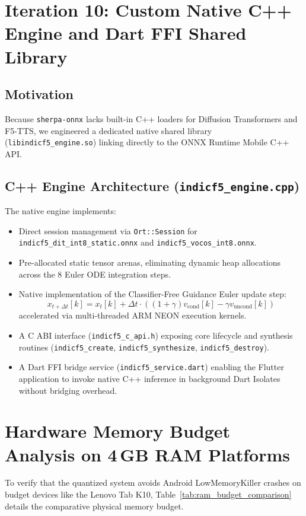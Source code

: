 \section{Iteration 10: Custom Native C++ Engine and Dart FFI Shared Library}
\subsection{Motivation}
Because \texttt{sherpa-onnx} lacks built-in C++ loaders for Diffusion Transformers and F5-TTS, we engineered a dedicated native shared library (\texttt{libindicf5\_engine.so}) linking directly to the ONNX Runtime Mobile C++ API.

\subsection{C++ Engine Architecture (\texttt{indicf5\_engine.cpp})}
The native engine implements:
\begin{itemize}
    \item Direct session management via \texttt{Ort::Session} for \texttt{indicf5\_dit\_int8\_static.onnx} and \texttt{indicf5\_vocos\_int8.onnx}.
    \item Pre-allocated static tensor arenas, eliminating dynamic heap allocations across the 8 Euler ODE integration steps.
    \item Native implementation of the Classifier-Free Guidance Euler update step:
    \begin{equation}
        x_{t+\Delta t}[k] = x_t[k] + \Delta t \cdot \left( (1 + \gamma) v_{\text{cond}}[k] - \gamma v_{\text{uncond}}[k] \right)
    \end{equation}
    accelerated via multi-threaded ARM NEON execution kernels.
    \item A C ABI interface (\texttt{indicf5\_c\_api.h}) exposing core lifecycle and synthesis routines (\texttt{indicf5\_create}, \texttt{indicf5\_synthesize}, \texttt{indicf5\_destroy}).
    \item A Dart FFI bridge service (\texttt{indicf5\_service.dart}) enabling the Flutter application to invoke native C++ inference in background Dart Isolates without bridging overhead.
\end{itemize}

\section{Hardware Memory Budget Analysis on \texorpdfstring{4\,GB}{4 GB} RAM Platforms}
To verify that the quantized system avoids Android LowMemoryKiller crashes on budget devices like the Lenovo Tab K10, Table~\ref{tab:ram_budget_comparison} details the comparative physical memory budget.

